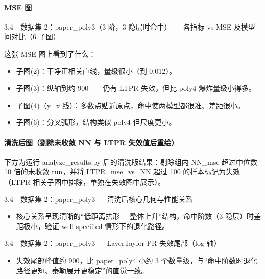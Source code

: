 \documentclass[UTF8,a4paper,11pt]{ctexart}
\begin{document}
\paragraph{MSE 图}

3.4　数据集 2：paper\_poly3（3 阶，3 隐层时命中） --- 各指标 vs MSE 及模型间对比（6 子图）

这张 MSE 图上看到了什么：

\begin{itemize}
\item 子图(2)：干净正相关直线，量级很小（到 0.012）。
\end{itemize}

\begin{itemize}
\item 子图(3)：纵轴到约 900------仍有 LTPR 失效，但比 poly4 爆炸量级小得多。
\end{itemize}

\begin{itemize}
\item 子图(4)（y=x 线）：多数点贴近原点，命中使两模型都很准、差距很小。
\end{itemize}

\begin{itemize}
\item 子图(6)：分叉弧形，结构类似 poly4 但尺度更小。
\end{itemize}

\paragraph{清洗后图（剔除未收敛 NN 与 LTPR 失效值后重绘）}

下方为运行 analyze\_results.py 后的清洗版结果：剔除组内 NN\_mse 超过中位数 10 倍的未收敛 run，并将 LTPR\_mse\_vs\_NN 超过 100 的样本标记为失效（LTPR 相关子图中排除，单独在失效图中展示）。

3.4　数据集 2：paper\_poly3 --- 清洗后核心几何与性能关系

\begin{itemize}
\item 核心关系呈现清晰的“低距离拱形 + 整体上升”结构，命中阶数（3 隐层）时差距极小，验证 well-specified 情形下的退化路径。
\end{itemize}

3.4　数据集 2：paper\_poly3 --- LayerTaylor-PR 失效尾部（log 轴）

\begin{itemize}
\item 失效尾部峰值约 900，比 paper\_poly4 小约 3 个数量级，与“命中阶数时退化路径更短、泰勒展开更稳定”的直觉一致。
\end{itemize}
\end{document}
